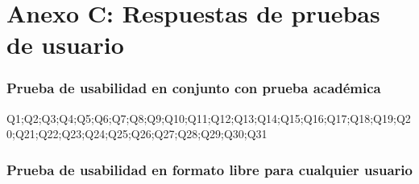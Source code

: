 \chapter*{Anexo C: Respuestas de pruebas de usuario}\label{AnexoC}

\subsection*{Prueba de usabilidad en conjunto con prueba académica}
Q1;Q2;Q3;Q4;Q5;Q6;Q7;Q8;Q9;Q10;Q11;Q12;Q13;Q14;Q15;Q16;Q17;Q18;Q19;Q20;Q21;Q22;Q23;Q24;Q25;Q26;Q27;Q28;Q29;Q30;Q31



\subsection*{Prueba de usabilidad en formato libre para cualquier usuario}
